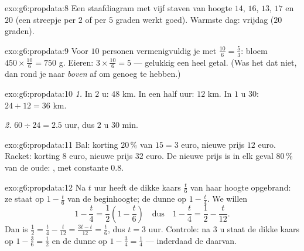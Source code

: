 \begin{solution}{exo:g6:propdata:8}
Een staafdiagram met vijf staven van hoogte $14$, $16$, $13$, $17$ en $20$ (een
streepje per $2$ of per $5$ graden werkt goed). Warmste dag: vrijdag ($20$
graden).
\end{solution}

\begin{solution}{exo:g6:propdata:9}
Voor $10$ personen vermenigvuldig je met $\frac{10}{6} = \frac53$: bloem
$450 \times \frac{10}{6} = 750$ g. Eieren: $3 \times \frac{10}{6} = 5$ ---
gelukkig een heel getal. (Was het dat niet, dan rond je naar \emph{boven} af om
genoeg te hebben.)
\end{solution}

\begin{solution}{exo:g6:propdata:10}
\emph{1.} In $2$ u: $48$ km. In een half uur: $12$ km. In $1$ u $30$:
$24 + 12 = 36$ km.

\emph{2.} $60 \div 24 = 2.5$ uur, dus $2$ u $30$ min.
\end{solution}

\begin{solution}{exo:g6:propdata:11}
Bal: korting $20\,\%$ van $15 = 3$ euro, nieuwe prijs $12$ euro. Racket: korting
$8$ euro, nieuwe prijs $32$ euro. De nieuwe prijs is in elk geval $80\,\%$ van de
oude: , met constante $0.8$.
\end{solution}

\begin{solution}{exo:g6:propdata:12}
Na $t$ uur heeft de dikke kaars $\frac t6$ van haar hoogte opgebrand: ze staat op
$1 - \frac t6$ van de beginhoogte; de dunne op $1 - \frac t4$. We willen
\[
1 - \frac t4 = \frac12 \left(1 - \frac t6\right)
\quad\text{dus}\quad
1 - \frac t4 = \frac12 - \frac t{12}.
\]
Dan is $\frac12 = \frac t4 - \frac t{12} = \frac{3t - t}{12} = \frac{t}{6}$, dus
$t = 3$ uur. Controle: na $3$ u staat de dikke kaars op $1 - \frac36 = \frac12$
en de dunne op $1 - \frac34 = \frac14$ --- inderdaad de  daarvan.
\end{solution}

